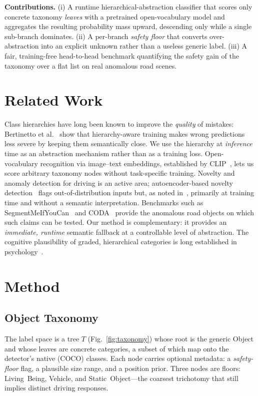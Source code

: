 \documentclass[conference]{IEEEtran}
\begin{document}
\textbf{Contributions.} (i) A runtime hierarchical-abstraction classifier that
scores only concrete taxonomy \emph{leaves} with a pretrained open-vocabulary
model and aggregates the resulting probability mass upward, descending only while
a single sub-branch dominates. (ii) A per-branch \emph{safety floor} that
converts over-abstraction into an explicit unknown rather than a useless generic
label. (iii) A fair, training-free head-to-head benchmark quantifying the safety
gain of the taxonomy over a flat list on real anomalous road scenes.

\section{Related Work}
\label{sec:related}

Class hierarchies have long been known to improve the \emph{quality} of
mistakes: Bertinetto et al.~\cite{bertinetto2020} show that hierarchy-aware
training makes wrong predictions less severe by keeping them semantically close.
We use the hierarchy at \emph{inference} time as an abstraction mechanism rather
than as a training loss. Open-vocabulary recognition via image--text embeddings,
established by CLIP~\cite{radford2021}, lets us score arbitrary taxonomy nodes
without task-specific training. Novelty and anomaly detection for driving is an
active area; autoencoder-based novelty detection~\cite{sedeh2021} flags
out-of-distribution inputs but, as noted in~\cite{schaller2025}, primarily at
training time and without a semantic interpretation. Benchmarks such as
SegmentMeIfYouCan~\cite{chan2021} and CODA~\cite{li2022} provide the anomalous
road objects on which such claims can be tested. Our method is complementary: it
provides an \emph{immediate, runtime} semantic fallback at a controllable level
of abstraction. The cognitive plausibility of graded, hierarchical categories is
long established in psychology~\cite{rosch1975}.

\section{Method}
\label{sec:method}

\subsection{Object Taxonomy}
The label space is a tree $T$ (Fig.~\ref{fig:taxonomy}) whose root is the generic
\textsf{Object} and whose leaves are concrete categories, a subset of which map
onto the detector's native (COCO) classes. Each node carries optional metadata:
a \emph{safety-floor} flag, a plausible size range, and a position prior. Three
nodes are floors: \textsf{Living~Being}, \textsf{Vehicle}, and
\textsf{Static~Object}---the coarsest trichotomy that still implies distinct
driving responses.
\end{document}
